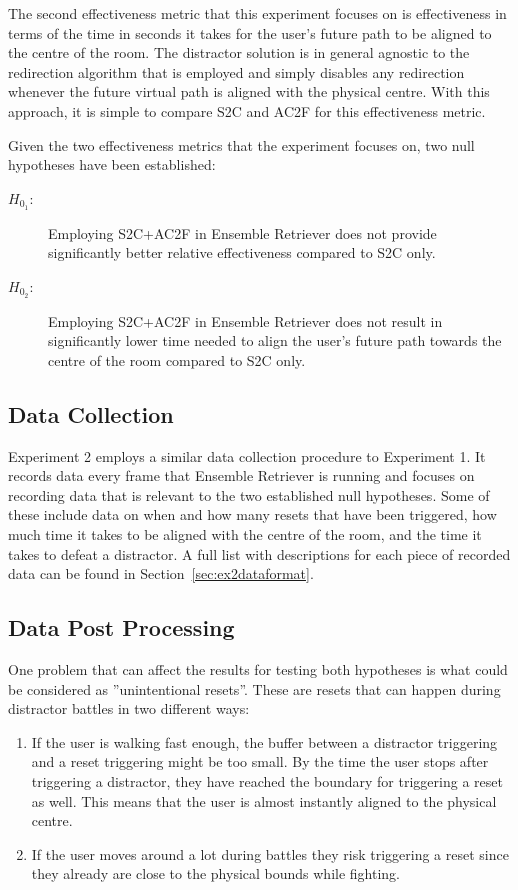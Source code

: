 The second effectiveness metric that this experiment focuses on is effectiveness in terms of the time in seconds it takes for the user's future path to be aligned to the centre of the room. The distractor solution is in general agnostic to the redirection algorithm that is employed and simply disables any redirection whenever the future virtual path is aligned with the physical centre. With this approach, it is simple to compare S2C and AC2F for this effectiveness metric.

Given the two effectiveness metrics that the experiment focuses on, two null hypotheses have been established:
\begin{description}
  \item[$H_{0_1}$:] Employing S2C+AC2F in Ensemble Retriever does not provide significantly better relative effectiveness compared to S2C only. 
  \item[$H_{0_2}$:] Employing S2C+AC2F in Ensemble Retriever does not result in significantly lower time needed to align the user's future path towards the centre of the room compared to S2C only.
\end{description}


\subsection{Data Collection}
Experiment 2 employs a similar data collection procedure to Experiment 1. It records data every frame that Ensemble Retriever is running and focuses on recording data that is relevant to the two established null hypotheses. Some of these include data on when and how many resets that have been triggered, how much time it takes to be aligned with the centre of the room, and the time it takes to defeat a distractor. A full list with descriptions for each piece of recorded data can be found in Section~\ref{sec:ex2dataformat}. 

\subsection{Data Post Processing}\label{sec:ex2postprocessing}
One problem that can affect the results for testing both hypotheses is what could be considered as ''unintentional resets''. These are resets that can happen during distractor battles in two different ways:
\begin{enumerate}
    \item If the user is walking fast enough, the buffer between a distractor triggering and a reset triggering might be too small. By the time the user stops after triggering a distractor, they have reached the boundary for triggering a reset as well. This means that the user is almost instantly aligned to the physical centre. 
    \item If the user moves around a lot during battles they risk triggering a reset since they already are close to the physical bounds while fighting. 
\end{enumerate}

